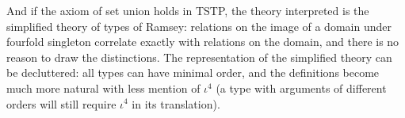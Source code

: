 \documentclass[12pt]{article}
\begin{document}
And if the axiom of set union holds in TSTP, the theory interpreted is the simplified theory of types of Ramsey:  relations
on the image of a domain under fourfold singleton correlate exactly with relations on the domain, and there is no reason to draw the distinctions.  The representation of the simplified theory can be decluttered:  all types can have minimal order, and the definitions become much more natural with less mention of $\iota^4$ (a type with arguments of different orders will still require $\iota^4$ in its translation).
\end{document}
